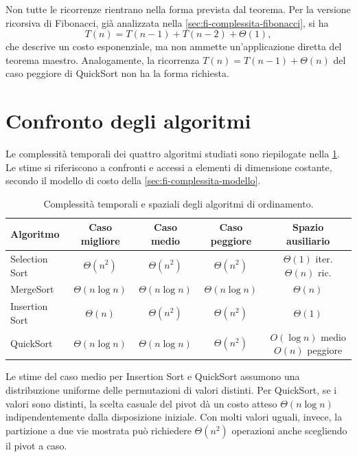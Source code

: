 Non tutte le ricorrenze rientrano nella forma prevista dal teorema.
Per la versione ricorsiva di Fibonacci, già analizzata
nella \cref{sec:fi-complessita-fibonacci}, si ha
\[
  T(n)=T(n-1)+T(n-2)+\Theta(1),
\]
che descrive un costo esponenziale, ma non ammette un'applicazione
diretta del teorema maestro. Analogamente, la ricorrenza
\(T(n)=T(n-1)+\Theta(n)\) del caso peggiore di QuickSort non ha
la forma richiesta.

\clearpage

\section{Confronto degli algoritmi}
\label{sec:fi-ordinamento-confronto}

Le complessità temporali dei quattro algoritmi studiati sono
riepilogate nella \cref{tab:fi-confronto-ordinamenti}. Le stime
si riferiscono a confronti e accessi a elementi di dimensione
costante, secondo il modello di costo della
\cref{sec:fi-complessita-modello}.

\begin{table}[htbp]
  \centering
  \small
  \setlength{\tabcolsep}{4pt}
  \begin{tabular}{lcccc}
    \toprule
    Algoritmo & Caso migliore & Caso medio & Caso peggiore &
    \shortstack{Spazio\\ausiliario}\\
    \midrule
    Selection Sort &
    \(\Theta(n^2)\) & \(\Theta(n^2)\) & \(\Theta(n^2)\) &
    \shortstack{\(\Theta(1)\) iter.\\\(\Theta(n)\) ric.}\\
    MergeSort &
    \(\Theta(n\log n)\) & \(\Theta(n\log n)\) & \(\Theta(n\log n)\) &
    \(\Theta(n)\)\\
    Insertion Sort &
    \(\Theta(n)\) & \(\Theta(n^2)\) & \(\Theta(n^2)\) &
    \(\Theta(1)\)\\
    QuickSort &
    \(\Theta(n\log n)\) & \(\Theta(n\log n)\) & \(\Theta(n^2)\) &
    \shortstack{\(O(\log n)\) medio\\\(O(n)\) peggiore}\\
    \bottomrule
  \end{tabular}
  \caption{Complessità temporali e spaziali degli algoritmi di ordinamento.}
  \label{tab:fi-confronto-ordinamenti}
\end{table}

Le stime del caso medio per Insertion Sort e QuickSort assumono
una distribuzione uniforme delle permutazioni di valori distinti.
Per QuickSort, se i valori sono distinti, la scelta casuale
del pivot dà un costo atteso \(\Theta(n\log n)\) indipendentemente
dalla disposizione iniziale. Con molti valori uguali, invece,
la partizione a due vie mostrata può richiedere
\(\Theta(n^2)\) operazioni anche scegliendo il pivot a caso.

